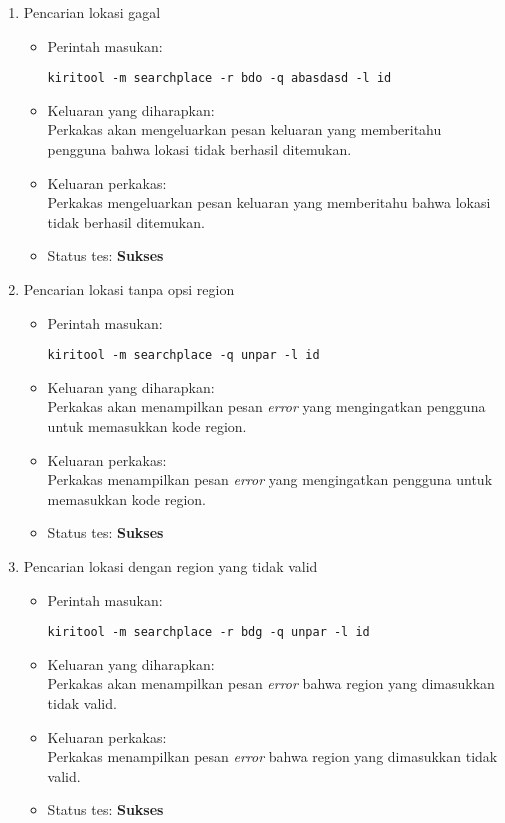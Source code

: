 \begin{enumerate}
	\item Pencarian lokasi gagal
	\begin{itemize}
		\item Perintah masukan:
		\begin{verbatim}
kiritool -m searchplace -r bdo -q abasdasd -l id
		\end{verbatim}
		\item Keluaran yang diharapkan: \\
		Perkakas akan mengeluarkan pesan keluaran yang memberitahu pengguna bahwa lokasi tidak berhasil ditemukan.
		\item Keluaran perkakas: \\
		Perkakas mengeluarkan pesan keluaran yang memberitahu bahwa lokasi tidak berhasil ditemukan.
		\item Status tes: \textbf{Sukses}
	\end{itemize}
	
	\item Pencarian lokasi tanpa opsi region
	\begin{itemize}
		\item Perintah masukan:
		\begin{verbatim}
kiritool -m searchplace -q unpar -l id
		\end{verbatim}
		\item Keluaran yang diharapkan: \\
		Perkakas akan menampilkan pesan \textit{error} yang mengingatkan pengguna untuk memasukkan kode region.
		\item Keluaran perkakas: \\
		Perkakas menampilkan pesan \textit{error} yang mengingatkan pengguna untuk memasukkan kode region.
		\item Status tes: \textbf{Sukses}
	\end{itemize}
	
	\item Pencarian lokasi dengan region yang tidak valid
	\begin{itemize}
		\item Perintah masukan:
		\begin{verbatim}
kiritool -m searchplace -r bdg -q unpar -l id
		\end{verbatim}
		\item Keluaran yang diharapkan: \\
		Perkakas akan menampilkan pesan \textit{error} bahwa region yang dimasukkan tidak valid.
		\item Keluaran perkakas: \\
		Perkakas menampilkan pesan \textit{error} bahwa region yang dimasukkan tidak valid.
		\item Status tes: \textbf{Sukses}
	\end{itemize}
	

\end{enumerate}
